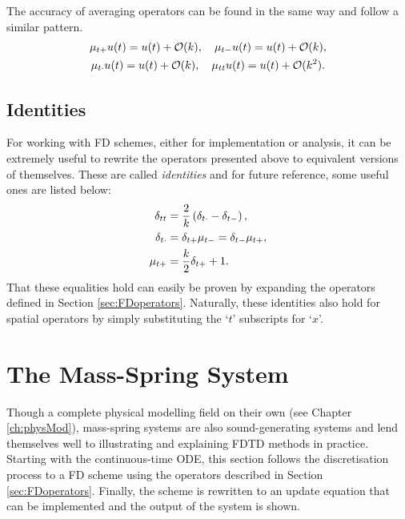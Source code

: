 The accuracy of averaging operators can be found in the same way and follow a similar pattern. 
\begin{equation}
    \begin{gathered}
    \mu_{t+} u(t) = u(t) + \mathcal{O}(k),\quad \mu_{t-} u(t)= u(t) + \mathcal{O}(k),\\
    \mu_{t\cdot} u(t)= u(t) + \mathcal{O}(k), \quad \mu_{tt} u(t)= u(t) + \mathcal{O}(k^2).
    \end{gathered}
\end{equation}

\subsection{Identities}
For working with FD schemes, either for implementation or analysis, it can be extremely useful to rewrite the operators presented above to equivalent versions of themselves. These are called \textit{identities} and for future reference, some useful ones are listed below:
\begin{subequations}
    \begin{align}
        \delta_{tt} &= \frac{2}{k}\left(\delta_{t\cdot}- \delta_{t-}\right),\label{eq:identity1}\\
        \delta_{t\cdot} &= \delta_{t+}\mu_{t-} = \delta_{t-}\mu_{t+}\label{eq:identity2},\\
        \mu_{t+} &= \frac{k}{2}\delta_{t+} + 1\label{eq:identity3}.
    \end{align}
\end{subequations}
That these equalities hold can easily be proven by expanding the operators defined in Section \ref{sec:FDoperators}. Naturally, these identities also hold for spatial operators by simply substituting the `$t$' subscripts for `$x$'. 

\section{%
The Mass-Spring System}\label{sec:massSpringSystem}
Though a complete physical modelling field on their own (see Chapter \ref{ch:physMod}), mass-spring systems are also sound-generating systems and lend themselves well to illustrating and explaining FDTD methods in practice. Starting with the continuous-time ODE, this section follows the discretisation process to a FD scheme using the operators described in Section \ref{sec:FDoperators}. Finally, the scheme is rewritten to an update equation that can be implemented and the output of the system is shown. 

